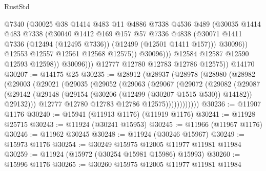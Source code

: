 \begin{lexlean}{RustStd}
\begin{coremodule}
{\begin{coremodule}
{{{{{{{{{{{{{{{{{{{{{{{{{{{{{{{{{{{{{{{{{{{{{{{{{{{{{{{{{{{{{{{{{{{{{{{{{{{{{{{{                          @7340
                          (@30025
                            @38
                            @1414
                            @483
                            @11
                            @4886
                            @7338
                            @4536
                            @489
                            (@30035
                              @1414
                              @483
                              @7338
                              (@30040
                                @1412
                                @169
                                @157
                                @57
                                @7336
                                @4838
                                (@30071
                                  @1411
                                  @7336
                                  (@12494 (@12495 @7336))
                                  (@12499 (@12501 @1411 @157)))
                                @30096))
                            @12553
                            @12557
                            @12561
                            @12568
                            @12575))
                        @30096)))
                  @12584
                  @12587
                  @12590
                  @12593
                  @12598))
              @30096)))
        @12777
        @12780
        @12783
        @12786
        @12575))
    @14170
@30207 := @14175 @25
@30235 := @28912
    (@28937
      (@28978
        (@28980
          (@28982
            (@29003
              (@29021
                (@29035
                  (@29052
                    (@29063
                      (@29067
                        (@29072
                          (@29082
                            (@29087
                              (@29142
                                (@29148
                                  (@29154 (@30206 (@12499 (@30207 @1515 @530)) @14182))
                                  @29132)))
                            @12777
                            @12780
                            @12783
                            @12786
                            @12575))))))))))))
@30236 := @11907 @1176
@30240 := @15941 (@11913 @1176) (@11919 @1176)
@30241 := @11928 @25715
@30243 := @11924 (@30241 @15953)
@30245 := @11966 (@11967 @1176)
@30246 := @11962 @30245
@30248 := @11924 (@30246 @15967)
@30249 := @15973 @1176
@30254 := @30249 @15975 @12005 @11977 @11981 @11984
@30259 := @11924 (@15972 (@30254 @15981 @15986) @15993)
@30260 := @15996 @1176
@30265 := @30260 @15975 @12005 @11977 @11981 @11984
}}}}}}}}}}}}}}}}}}}}}}}}}}}}}}}}}}}}}}}}}}}}}}}}}}}}}}}}}}}}}}}}}}}}}}}}}}}}}}}}
\end{coremodule}}
\end{coremodule}
\end{lexlean}
